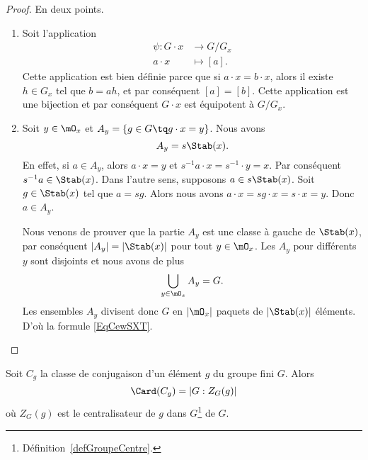 \begin{proof}
	En deux points.
	\begin{enumerate}
		\item
		      Soit l'application
		      \begin{equation}
			      \begin{aligned}
				      \psi\colon G\cdot x & \to G/G_x    \\
				      a\cdot x            & \mapsto [a].
			      \end{aligned}
		      \end{equation}
		      Cette application est bien définie parce que si \( a\cdot x=b\cdot x\), alors il existe \( h\in G_x\) tel que \( b=ah\), et par conséquent \( [a]=[b]\). Cette application est une bijection et par conséquent \( G\cdot x\) est équipotent à \( G/G_x\).
		\item
		      Soit \( y\in \mO_x\) et \( A_y=\{ g\in G\tq g\cdot x=y \}\). Nous avons
              \begin{equation}
                  A_y=s\Stab(x).
              \end{equation}
              En effet, si \( a\in A_y\), alors \( a\cdot x=y\) et \( s^{-1} a\cdot x=s^{-1}\cdot y=x\). Par conséquent \( s^{-1}a\in\Stab(x)\). Dans l'autre sens, supposons \( a\in s\Stab(x)\). Soit \( g\in\Stab(x)\) tel que \( a=sg\). Alors nous avons \( a\cdot x=sg\cdot x=s\cdot x=y\). Donc \( a\in A_y\).

              Nous venons de prouver que la partie \( A_y\) est une classe à gauche de \( \Stab(x)\), par conséquent \( | A_y |=|\Stab(x)|\) pour tout \( y\in\mO_x\). Les \( A_y\) pour différents \( y\) sont disjoints et nous avons de plus
		      \begin{equation}
			      \bigcup_{y\in\mO_x}A_y=G.
		      \end{equation}
		      Les ensembles \( A_y\) divisent donc \( G\) en \( | \mO_x |\) paquets de \( | \Stab(x) |\) éléments. D'où la formule \eqref{EqCewSXT}.
	\end{enumerate}
\end{proof}

\begin{corollary}       \label{CORooRRVHooTyCjZZ}
	Soit \( C_g\) la classe de conjugaison d'un élément  \( g\) du groupe fini \( G\). Alors
	\begin{equation}
		\Card(C_g)=| G:Z_G(g) |
	\end{equation}
	où \( Z_G(g)\) est le centralisateur de \( g\) dans \( G\)\footnote{Définition~\ref{defGroupeCentre}.} de \( G\).
\end{corollary}

